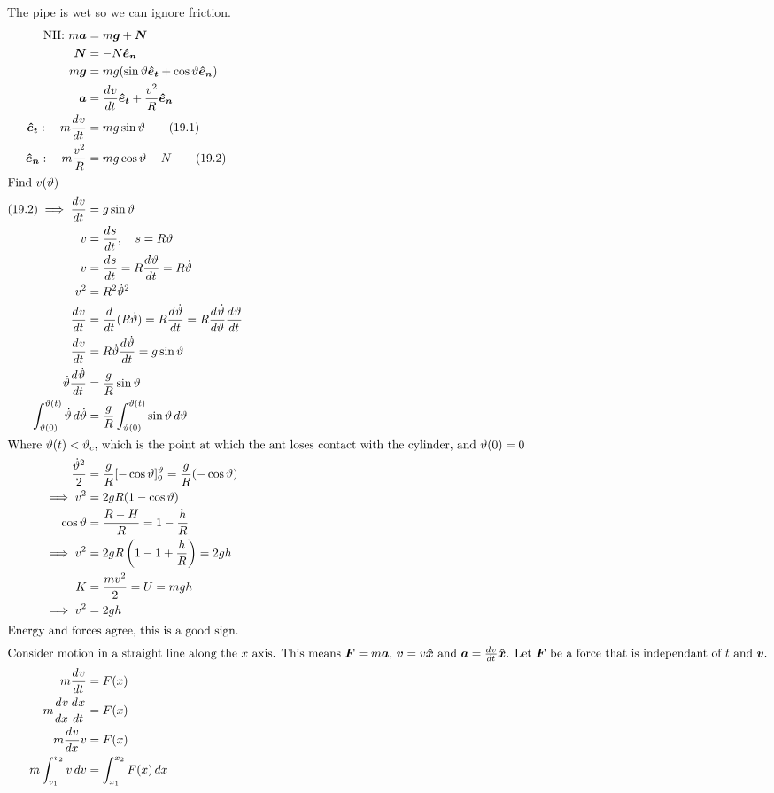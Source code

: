 \documentclass{article}
\newcommand{\vh}[1]{\vec{\hat{#1}}}
\renewcommand{\vec}[1]{\bm{#1}}
\newcommand{\vv}[1]{\vec{#1}}
\newcommand{\ve}[1]{\vec{\hat{e}_{#1}}}
\newcommand{\dv}[3][]{\frac{d^{#1}{#2}}{d{#3}^{#1}}}
\newcommand{\diff}[2][]{\frac{d^{#1}}{d{#2}^{#1}}}
\begin{document}
The pipe is wet so we can ignore friction.
\begin{align*}
\text{NII: }m\vv a&=m\vv g+\vv N\\
\vv N&=-N\ve n\\
m\vv g&=mg(\sin\vartheta\ve t+\cos\vartheta\ve n)\\
\vv a&=\dv vt\ve t+\frac{v^2}{R}\ve n\\
\ve t:\quad m\dv vt&=mg\sin\vartheta\tag{19.1}\\
\ve n:\quad m\frac{v^2}{R}&=mg\cos\vartheta-N\tag{19.2}\\
\intertext{Find \(v(\vartheta)\)}
(19.2)\implies \dv vt&=g\sin\vartheta\\
v&=\dv st,\quad s=R\vartheta\\
v&=\dv st=R\dv \vartheta t=R\dot\vartheta\\
v^2&=R^2\dot\vartheta^2\\
\dv vt&=\diff t(R\dot\vartheta)=R\dv{\dot\vartheta}{t}=R\dv{\dot\vartheta}{\vartheta}\dv{\vartheta}{t}\\
\dv vt&=R\dot\vartheta\dv{\dot\vartheta}{t}=g\sin\vartheta\\
\dot\vartheta\dv{\dot\vartheta}{t}&=\frac{g}{R}\sin\vartheta\\
\int_{\vartheta(0)}^{\vartheta(t)}\dot\vartheta\,d\dot\vartheta&=\frac{g}{R}\int_{\vartheta(0)}^{\vartheta(t)}\sin\vartheta\,d\vartheta\\
\intertext{Where \(\vartheta(t)<\vartheta_c\), which is the point at which the ant loses contact with the cylinder, and \(\vartheta(0)=0\)}
\frac{\dot\vartheta^2}{2}&=\frac{g}{R}[-\cos\vartheta]_0^{\vartheta}=\frac{g}{R}(-\cos\vartheta)\\
\implies v^2&=2gR(1-\cos\vartheta)\\
\cos\vartheta&=\frac{R-H}{R}=1-\frac{h}{R}\\
\implies v^2&=2gR\left(1-1+\frac{h}{R}\right)=2gh\\
K&=\frac{mv^2}{2}=U=mgh\\
\implies v^2&=2gh\\
\intertext{Energy and forces agree, this is a good sign.}
\intertext{Consider motion in a straight line along the \(x\) axis. This means \(\vv F=m\vv a\), \(\vv v=v\vh x\) and \(\vv a=\dv vt\vh x\). Let \(\vv F\) be a force that is independant of \(t\) and \(\vv v\).}
m\dv vt&=F(x)\\
m\dv vx\dv xt&=F(x)\\
m\dv vx v&=F(x)\\
m\int_{v_1}^{v_2} v\,dv&=\int_{x_1}^{x_2}F(x)\,dx\\

\end{align*}
\end{document}
